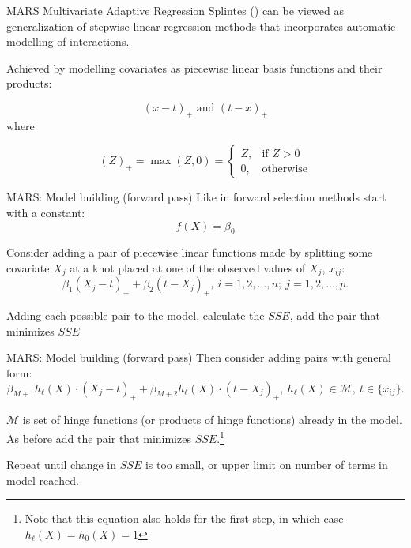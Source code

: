 \documentclass[handout]{beamer}
\begin{document}
\begin{frame}{MARS}
  Multivariate Adaptive Regression Splintes (\cite{mars}) can be viewed as generalization of stepwise linear regression methods that incorporates automatic modelling of interactions. 
  
  Achieved by modelling covariates as piecewise linear basis functions and their products:
  
  \begin{equation*} \label{eq:bases}
    (x - t)_{+} \text{ and } (t - x)_{+}
  \end{equation*} where
  
  \begin{equation*}
    (Z)_{+} = \max(Z, 0) = \begin{cases}
    Z, & \text{if } Z > 0 \\
    0, & \text{otherwise}
    \end{cases}
  \end{equation*}
\end{frame}

\begin{frame}{MARS: Model building (forward pass)}
  Like in forward selection methods start with a constant:
  \begin{equation*}
    f(X) = \beta_{0}
  \end{equation*}
  
  Consider adding a pair of piecewise linear functions made by splitting some covariate $X_{j}$ at a knot placed at one of the observed values of $X_{j}$, $x_{ij}$:
  \begin{equation*}
  \beta_{1} (X_{j} - t)_{+} + \beta_{2}(t - X_{j})_{+}, \ i = 1, 2, \ldots, n; \ j = 1, 2, \ldots, p.
  \end{equation*}
  
  Adding each possible pair to the model, calculate the $SSE$, add the pair that minimizes $SSE$
\end{frame}

\begin{frame}{MARS: Model building (forward pass)}
  Then consider adding pairs with general form:
  \begin{equation*} \label{eq:gen-pairs-add}
    \beta_{M + 1} h_{\ell}(X) \cdot (X_{j} - t)_{+} + \beta_{M + 2} h_{\ell}(X) \cdot (t - X_{j})_{+}, \ h_{\ell}(X) \in \mathcal{M}, \ t \in \{x_{ij}\}.
  \end{equation*}
  
  $\mathcal{M}$ is set of hinge functions (or products of hinge functions) already in the model. As before add the pair that minimizes $SSE$.\footnote{Note that this equation also holds for the first step, in which case $h_{\ell}(X) = h_{0}(X) = 1$}
  
  Repeat until change in $SSE$ is too small, or upper limit on number of terms in model reached.
\end{frame}
\end{document}
